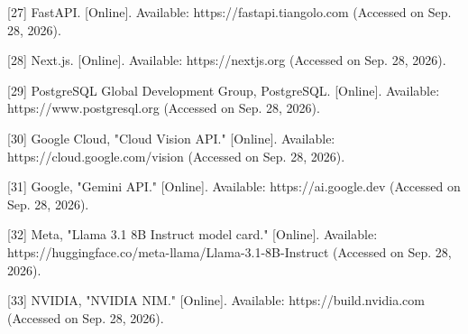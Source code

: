 \documentclass[12pt,a4paper]{article}
\begin{document}
\hangindent=0.35in  \textnormal{[27]} FastAPI. [Online]. Available: https://fastapi.tiangolo.com (Accessed on Sep. 28, 2026).\par

\hangindent=0.35in  \textnormal{[28]} Next.js. [Online]. Available: https://nextjs.org (Accessed on Sep. 28, 2026).\par

\hangindent=0.35in  \textnormal{[29]} PostgreSQL Global Development Group, PostgreSQL. [Online]. Available: https://www.postgresql.org (Accessed on Sep. 28, 2026).\par

\hangindent=0.35in  \textnormal{[30]} Google Cloud, "Cloud Vision API." [Online]. Available: https://cloud.google.com/vision (Accessed on Sep. 28, 2026).\par

\hangindent=0.35in  \textnormal{[31]} Google, "Gemini API." [Online]. Available: https://ai.google.dev (Accessed on Sep. 28, 2026).\par

\hangindent=0.35in  \textnormal{[32]} Meta, "Llama 3.1 8B Instruct model card." [Online]. Available: https://huggingface.co/meta-llama/Llama-3.1-8B-Instruct (Accessed on Sep. 28, 2026).\par

\hangindent=0.35in  \textnormal{[33]} NVIDIA, "NVIDIA NIM." [Online]. Available: https://build.nvidia.com (Accessed on Sep. 28, 2026).\par

\endgroup
\end{document}
